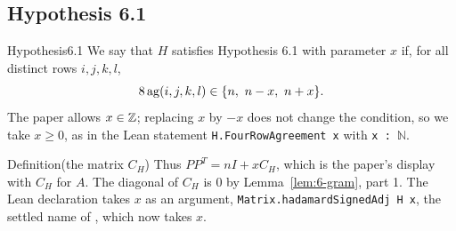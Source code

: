 \subsection{Hypothesis 6.1}

\begin{cgss}{Hypothesis}{6.1}\label{hyp:6.1}
 We say that $H$ satisfies Hypothesis 6.1 with parameter $x$ if, for all distinct rows
 $i,j,k,l$,
 \[
  8\agr(i,j,k,l)\in\{n,\ n-x,\ n+x\}.
 \]
 The paper allows $x\in{\mathbb Z}$; replacing $x$ by $-x$ does not change the condition, so we take
 $x\geq0$, as in the Lean statement \texttt{H.FourRowAgreement x} with
 \texttt{x : \ensuremath{\mathbb N}}.
\end{cgss}

\begin{namedresult}{Definition}{(the matrix $C_H$)}\label{def:6-CH}
 Thus $PP^T=nI+xC_H$, which is the paper's display with $C_H$ for $A$. The diagonal of $C_H$ is
 0 by Lemma~\ref{lem:6-gram}, part 1. The Lean declaration takes $x$ as an argument,
 \texttt{Matrix.hadamardSignedAdj H x}, the settled name of , which
 now takes $x$.
\end{namedresult}


